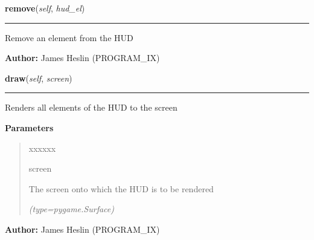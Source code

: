     \label{pystroke:hud:HUD:remove}

    \vspace{0.5ex}

\hspace{.8\funcindent}\begin{boxedminipage}{\funcwidth}

    \raggedright \textbf{remove}(\textit{self}, \textit{hud\_el})

    \vspace{-1.5ex}

    \rule{\textwidth}{0.5\fboxrule}
\setlength{\parskip}{2ex}
    Remove an element from the HUD

\setlength{\parskip}{1ex}
\textbf{Author:} James Heslin (PROGRAM\_IX)



    \end{boxedminipage}

    \label{pystroke:hud:HUD:draw}

    \vspace{0.5ex}

\hspace{.8\funcindent}\begin{boxedminipage}{\funcwidth}

    \raggedright \textbf{draw}(\textit{self}, \textit{screen})

    \vspace{-1.5ex}

    \rule{\textwidth}{0.5\fboxrule}
\setlength{\parskip}{2ex}
    Renders all elements of the HUD to the screen

\setlength{\parskip}{1ex}
      \textbf{Parameters}
      \vspace{-1ex}

      \begin{quote}
        \begin{Ventry}{xxxxxx}

          \item[screen]

          The screen onto which the HUD is to be rendered

            {\it (type=pygame.Surface)}

        \end{Ventry}

      \end{quote}

\textbf{Author:} James Heslin (PROGRAM\_IX)



    \end{boxedminipage}

